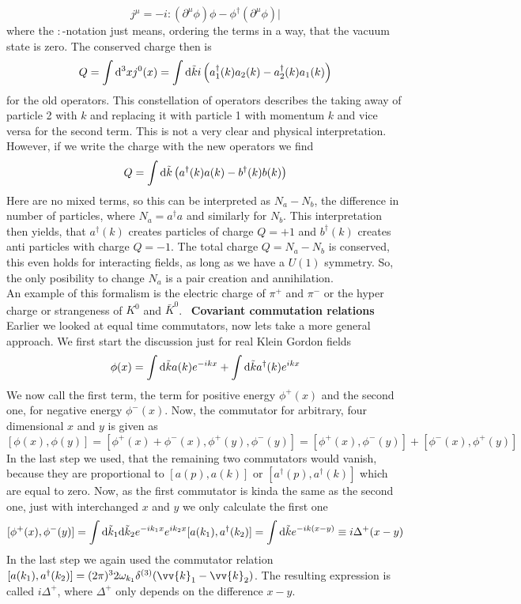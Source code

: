 \documentclass{include/thesisclass}
\newcommand{\dd}{{\rm d}}
\newcommand{\p}{\partial}
\newcommand{\sub}[1]{~\newline\newline\textbf{#1}\\}
\begin{document}
\[ j^\mu = -i:(\p^\mu \phi)\phi - \phi^\dagger(\p^\mu \phi)|\]
where the $:$-notation just means, ordering the terms in a way, that the vacuum state is zero. The conserved charge then is
\[ Q = \int \dd ^3 x j^0(x) = \int \dd \tilde{k} i \left( a_1^\dagger(k) a_2(k) - a_2^\dagger(k) a_1(k) \right)\]
for the old operators. This constellation of operators describes the taking away of particle 2 with $k$ and replacing it with particle 1 with momentum $k$ and vice versa for the second term. This is not a very clear and physical interpretation. However, if we write the charge with the new operators we find
\[  Q = \int \dd \tilde{k} \left( a^\dagger(k) a(k) - b^\dagger(k)b(k)\right)\]
Here are no mixed terms, so this can be interpreted as $N_a- N_b$, the difference in number of particles, where $N_a = a^\dagger a$ and similarly for $N_b$. This interpretation then yields, that $a^\dagger(k)$ creates particles of charge $Q = +1$ and $b^\dagger(k)$ creates anti particles with charge $Q = -1$. The total charge $Q = N_a - N_b$ is conserved, this even holds for interacting fields, as long as we have a $U(1)$ symmetry. So, the only posibility to change $N_a$ is a pair creation and annihilation.\\
An example of this formalism is the electric charge of $\pi^+$ and $\pi^-$ or the hyper charge or strangeness of $K^0$ and $\bar{K}^0$.
\sub{Covariant commutation relations}
Earlier we looked at equal time commutators, now lets take a more general approach. We first start the discussion just for real Klein Gordon fields
\[ \phi(x) = \int \dd \tilde{k} a(k) e^{-ikx} + \int \dd \tilde{k} a^\dagger(k) e^{ikx}\]
We now call the first term, the term for positive energy $\phi^+(x)$ and the second one, for negative energy $\phi^-(x)$. Now, the commutator for arbitrary, four dimensional $x$ and $y$ is given as
\[ [ \phi(x), \phi(y)] = [\phi^+(x) + \phi^-(x), \phi^+(y), \phi^-(y)]=[\phi^+(x), \phi^-(y)] + [ \phi^-(x), \phi^+(y)]\]
In the last step we used, that the remaining two commutators would vanish, because they are proportional to $[a(p),a(k)]$ or $[a^\dagger(p), a^\dagger(k)]$ which are equal to zero.  Now, as the first commutator is kinda the same as the second one, just with interchanged $x$ and $y$ we only calculate the first one
\[ [\phi^+(x), \phi^-(y)] = \int \dd \tilde{k}_1 \dd \tilde{k}_2 e^{-ik_1x} e^{ik_2x} [a(k_1), a^\dagger(k_2)] = \int \dd \tilde{k} e^{-ik(x-y)} \equiv i \Delta^+(x-y)\]
In the last step we again used the commutator relation $[ a(k_1), a^\dagger(k_2)] = (2\pi)^3 2 \omega_{k_1} \delta^{(3)} (\vv{k}_1 - \vv{k}_2)$. The resulting expression is called $i \Delta^+$, where $\Delta^+$ only depends on the difference $x-y$.\\
\end{document}
